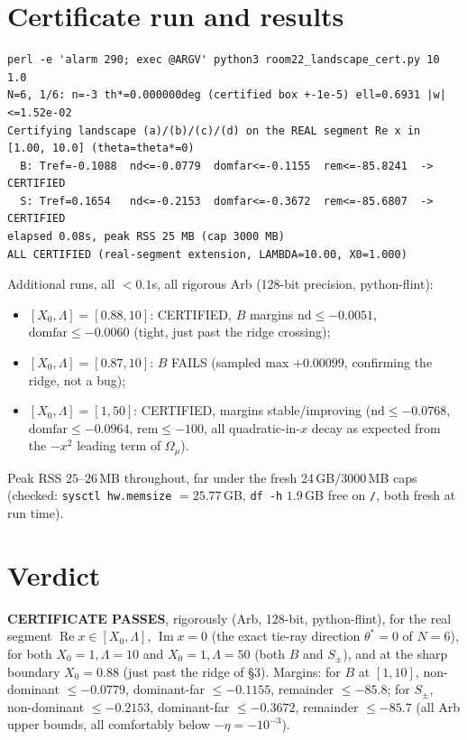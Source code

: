 \documentclass[11pt]{article}
\begin{document}
\section{Certificate run and results}
\begin{verbatim}
perl -e 'alarm 290; exec @ARGV' python3 room22_landscape_cert.py 10 1.0
N=6, 1/6: n=-3 th*=0.000000deg (certified box +-1e-5) ell=0.6931 |w|<=1.52e-02
Certifying landscape (a)/(b)/(c)/(d) on the REAL segment Re x in [1.00, 10.0] (theta=theta*=0)
  B: Tref=-0.1088  nd<=-0.0779  domfar<=-0.1155  rem<=-85.8241  -> CERTIFIED
  S: Tref=0.1654   nd<=-0.2153  domfar<=-0.3672  rem<=-85.6807  -> CERTIFIED
elapsed 0.08s, peak RSS 25 MB (cap 3000 MB)
ALL CERTIFIED (real-segment extension, LAMBDA=10.00, X0=1.000)
\end{verbatim}
Additional runs, all $<0.1$s, all rigorous Arb (128-bit precision, python-flint):
\begin{itemize}
\item $[X_0,\Lambda]=[0.88,10]$: CERTIFIED, $B$ margins $\mathrm{nd}\le-0.0051$, $\mathrm{domfar}\le-0.0060$
(tight, just past the ridge crossing);
\item $[X_0,\Lambda]=[0.87,10]$: $B$ FAILS (sampled max $+0.00099$, confirming the ridge, not a bug);
\item $[X_0,\Lambda]=[1,50]$: CERTIFIED, margins stable/improving ($\mathrm{nd}\le-0.0768$,
$\mathrm{domfar}\le-0.0964$, $\mathrm{rem}\le-100$, all quadratic-in-$x$ decay as expected from the
$-x^2$ leading term of $\Omega_\mu$).
\end{itemize}
Peak RSS $25$--$26$\,MB throughout, far under the fresh 24\,GB/3000\,MB caps (checked: \texttt{sysctl
hw.memsize} $=25.77$\,GB, \texttt{df -h} $1.9$\,GB free on \texttt{/}, both fresh at run time).

\section*{Verdict}
\textbf{CERTIFICATE PASSES}, rigorously (Arb, 128-bit, python-flint), for the real segment
$\operatorname{Re}x\in[X_0,\Lambda]$, $\operatorname{Im}x=0$ (the exact tie-ray direction $\theta^*=0$ of
$N=6$), for both $X_0=1,\Lambda=10$ and $X_0=1,\Lambda=50$ (both $B$ and $S_\pm$), and at the sharp
boundary $X_0=0.88$ (just past the ridge of \S3). Margins: for $B$ at $[1,10]$, non-dominant
$\le-0.0779$, dominant-far $\le-0.1155$, remainder $\le-85.8$; for $S_\pm$, non-dominant $\le-0.2153$,
dominant-far $\le-0.3672$, remainder $\le-85.7$ (all Arb upper bounds, all comfortably below $-\eta=-10^{-3}$).
\end{document}
